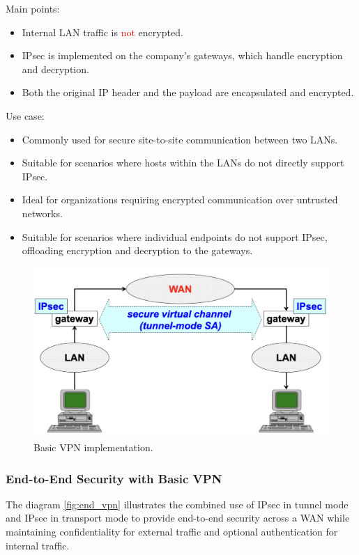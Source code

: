 Main points:
\begin{itemize}
    \item Internal LAN traffic is \textcolor{red}{not} encrypted.
    \item IPsec is implemented on the company's gateways, which handle encryption and decryption.
    \item Both the original IP header and the payload are encapsulated and encrypted.
\end{itemize}

Use case:
\begin{itemize}
    \item Commonly used for secure site-to-site communication between two LANs.
    \item Suitable for scenarios where hosts within the LANs do not directly support IPsec.
    \item Ideal for organizations requiring encrypted communication over untrusted networks.
    \item Suitable for scenarios where individual endpoints do not support IPsec, offloading encryption and decryption to the gateways.
\end{itemize}

\begin{figure}[H]
  \includegraphics[width=\linewidth]{Images/NetSec/basic_vpn.png}
  \caption{Basic VPN implementation.}
  \label{fig:basicVPN}
\end{figure}

\subsubsection{End-to-End Security with Basic VPN}
The diagram \ref{fig:end_vpn} illustrates the combined use of IPsec in tunnel mode and IPsec in transport mode to provide end-to-end security across a WAN while maintaining confidentiality for external traffic and optional authentication for internal traffic.

